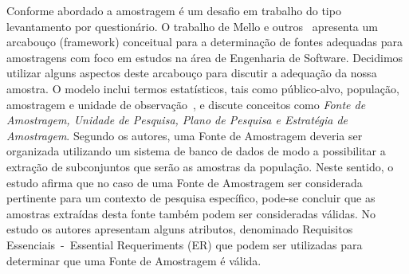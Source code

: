 Conforme abordado a amostragem é um desafio em trabalho do tipo levantamento
por questionário. O trabalho de Mello e outros~\cite{de2014towards} apresenta um
arcabouço (framework) conceitual para a determinação de fontes adequadas para
amostragens com foco em estudos na área de Engenharia de Software. Decidimos
utilizar alguns aspectos deste arcabouço para discutir a adequação da nossa
amostra. O modelo inclui termos estatísticos, tais como público-alvo, população,
amostragem e unidade de observação~\cite{thompson2012sampling}, e discute
conceitos como \textit{Fonte de Amostragem, Unidade de Pesquisa, Plano de
    Pesquisa e Estratégia de Amostragem}. Segundo os autores, uma Fonte de
Amostragem deveria ser organizada utilizando um sistema de banco de dados de
modo a possibilitar a extração de subconjuntos que serão as amostras da
população. Neste sentido, o estudo afirma que no caso de uma Fonte de Amostragem
ser considerada pertinente para um contexto de pesquisa específico, pode-se
concluir que as amostras extraídas desta fonte também podem ser consideradas
válidas. No estudo os autores apresentam alguns atributos, denominado
Requisitos Essenciais~-~Essential Requeriments (ER) que podem ser utilizadas
para determinar que uma Fonte de Amostragem é válida.


